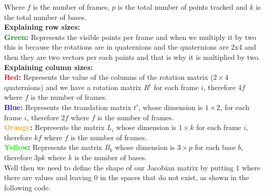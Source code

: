 \noindent Where $f$ is the number of frames, $p$ is the total number of points tracked and $k$ is the total number of bases.\\

\noindent \textbf{Explaining row sizes:}\\

\noindent \textbf{\textcolor{green}{Green}:} Represents the visible points per frame and when we multiply it by two this is because the rotations are in quaternions and the quaternions are 2x4 and then they are two vectors per each points and that is why it is multiplied by two.\\

\noindent \textbf{Explaining column sizes:}\\

\noindent \textbf{\textcolor{red}{Red}:} Represents the value of the columns of the rotation matrix ($2\times 4$ quaternions) and we have a rotation matrix $R^{i}$ for each frame $i$, therefore $4f$ where $f$ is the number of frames.\\

\noindent \textbf{\textcolor{blue}{Blue}:} Represents the translation matrix $t^{i}$, whose dimension is $1\times 2$, for each frame $i$, therefore $2f$ where $f$ is the number of frames.\\

\noindent \textbf{\textcolor{orange}{Orange}:} Represents the matrix $L_{i}$ whose dimension is $1\times k$ for each frame $i$, therefore $kf$ where $f$ is the number of frames.\\

\noindent \textbf{\textcolor{lime}{Yellow}:} Represents the matrix $B_{b}$ whose dimension is $3\times p$ for each base $b$, therefore $3pk$ where $k$ is the number of bases.\\

\noindent Well then we need to define the shape of our Jacobian matrix by putting $1$ where there are values and leaving $0$ in the spaces that do not exist, as shown in the following code.\\

